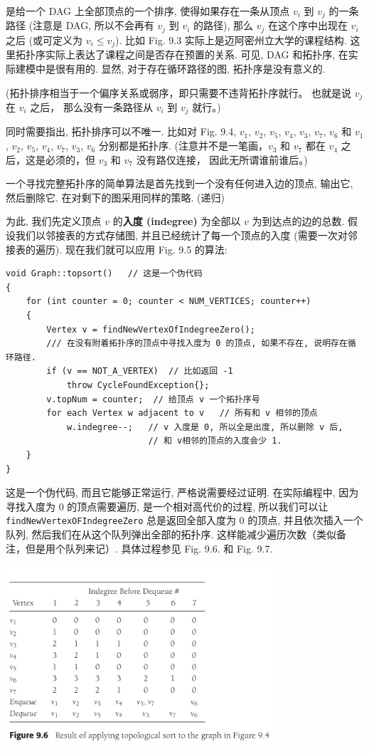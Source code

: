 \documentclass[a4paper]{ctexart}
\theoremstyle{definition}
\theoremstyle{definition}
\begin{document}
 是给一个 DAG 上全部顶点的一个排序,
使得如果存在一条从顶点 $v_i$ 到 $v_j$ 的一条路径
(注意是 DAG, 所以不会再有 $v_j$ 到 $v_i$ 的路径),
那么 $v_j$ 在这个序中出现在 $v_i$ 之后 (或可定义为 $v_i \leq v_j$).
比如 Fig. 9.3 实际上是迈阿密州立大学的课程结构.
这里拓扑序实际上表达了课程之间是否存在预置的关系.
可见, DAG 和拓扑序, 在实际建模中是很有用的.
显然, 对于存在循环路径的图, 拓扑序是没有意义的. 

(拓扑排序相当于一个偏序关系或弱序，即只需要不违背拓扑序就行。
也就是说 $v_j$ 在 $v_i$ 之后， 
那么没有一条路径从 $v_i$ 到 $v_j$ 就行。)

同时需要指出, 拓扑排序可以不唯一.
比如对 Fig. 9.4, $v_1$, $v_2$, $v_5$, $v_4$, $v_3$, $v_7$, $v_6$ 和
$v_1$, $v_2$, $v_5$, $v_4$, $v_7$, $v_3$, $v_6$ 分别都是拓扑序. 
(注意并不是一笔画，$v_3$ 和 $v_7$ 都在 $v_4$ 之后，这是必须的，但 $v_3$ 和 $v_7$ 没有路仅连接，
因此无所谓谁前谁后。)

一个寻找完整拓扑序的简单算法是首先找到一个没有任何进入边的顶点,
输出它, 然后删除它. 在对剩下的图采用同样的策略. (递归)

为此, 我们先定义顶点 $v$ 的{\bf 入度 (indegree)} 为全部以
$v$ 为到达点的边的总数. 假设我们以邻接表的方式存储图,
并且已经统计了每一个顶点的入度 (需要一次对邻接表的遍历).
现在我们就可以应用 Fig. 9.5 的算法:

\begin{verbatim}
void Graph::topsort()   // 这是一个伪代码
{
    for (int counter = 0; counter < NUM_VERTICES; counter++)
    {
        Vertex v = findNewVertexOfIndegreeZero();
        /// 在没有附着拓扑序的顶点中寻找入度为 0 的顶点, 如果不存在, 说明存在循环路径.
        if (v == NOT_A_VERTEX)  // 比如返回 -1
            throw CycleFoundException{};
        v.topNum = counter;  // 给顶点 v 一个拓扑序号
        for each Vertex w adjacent to v   // 所有和 v 相邻的顶点
            w.indegree--;   // v 入度是 0, 所以全是出度, 所以删除 v 后, 
                            // 和 v相邻的顶点的入度会少 1.
    }
}
\end{verbatim}

这是一个伪代码, 而且它能够正常运行, 严格说需要经过证明. 在实际编程中,
因为寻找入度为 0 的顶点需要遍历, 是一个相对高代价的过程,
所以我们可以让 \verb|findNewVertexOFIndegreeZero|
总是返回全部入度为 0 的顶点, 并且依次插入一个队列,
然后我们在从这个队列弹出全部的拓扑序.
这样能减少遍历次数（类似备注，但是用个队列来记）. 
具体过程参见 Fig. 9.6. 和 Fig. 9.7.
\begin{center}
  \includegraphics[width=0.75\textwidth]{images/FIG9_6.png}
\end{center}
\end{document}
